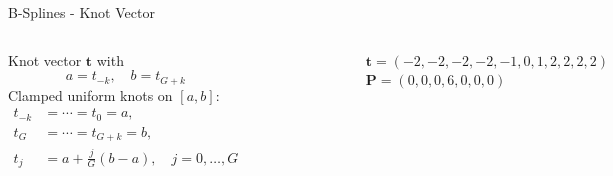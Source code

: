 \documentclass[aspectratio=169]{beamer}
\begin{document}
\begin{frame}{B-Splines - Knot Vector}
	
	\begin{columns}[T,onlytextwidth]
		
		
		Knot vector $\mathbf{t}$ with
		$$a=t_{-k},\quad b=t_{G+k}$$
		Clamped uniform knots on $[a,b]$:
		\begin{align*}
			t_{-k} &=\cdots=t_{0}=a,\\
			t_{G} &=\cdots=t_{G+k}=b,\\
			t_{j} &= a+\frac{j}{G}(b-a),\quad j=0,\dots,G\\
		\end{align*}
		
		\begin{figure}
			\centering
			\includegraphics[height=0.6\textheight]{../images/Cardinal_cubic_B-spline2.png}
		\end{figure}
		$\mathbf{t}=(-2, -2, -2, -2, -1, 0, 1, 2, 2, 2, 2)$\\
		$\mathbf{P}=(0, 0, 0, 6, 0, 0, 0)$
		
	\end{columns}
	
\end{frame}

\end{document}
